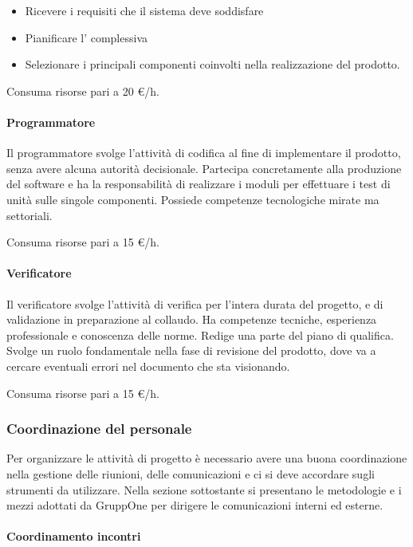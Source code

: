 \documentclass[../../norme-di-progetto.tex]{subfiles}
\begin{document}
\begin{itemize}
  \item Ricevere i requisiti che il sistema deve soddisfare
  \item Pianificare l' complessiva
  \item Selezionare i principali componenti coinvolti nella realizzazione del prodotto.
\end{itemize}

Consuma risorse pari a 20 €/h.

\paragraph{Programmatore}%
\label{par:programmatore}
Il programmatore svolge l'attività di codifica al fine di implementare il prodotto, senza avere alcuna autorità decisionale.
Partecipa concretamente alla produzione del software e ha la responsabilità di realizzare i moduli per effettuare i test di unità sulle singole componenti.
Possiede competenze tecnologiche mirate ma settoriali.

Consuma risorse pari a 15 €/h.

\paragraph{Verificatore}%
\label{par:verificatore}
Il verificatore svolge l'attività di verifica per l'intera durata del progetto, e di validazione in preparazione al collaudo.
Ha competenze tecniche, esperienza professionale e conoscenza delle norme. Redige una parte del piano di qualifica.
Svolge un ruolo fondamentale nella fase di revisione del prodotto, dove va a cercare eventuali errori nel documento che sta visionando.

Consuma risorse pari a 15 €/h.

\subsubsection{Coordinazione del personale}%
\label{subs:coordinazione_del_personale}
Per organizzare le attività di progetto è necessario avere una buona coordinazione nella gestione delle riunioni, delle comunicazioni e ci si deve accordare sugli strumenti da utilizzare.
Nella sezione sottostante si presentano le metodologie e i mezzi adottati da GruppOne per dirigere le comunicazioni interni ed esterne.

\paragraph{Coordinamento incontri}%
\label{par:coordinamento_incontri}
\end{document}

